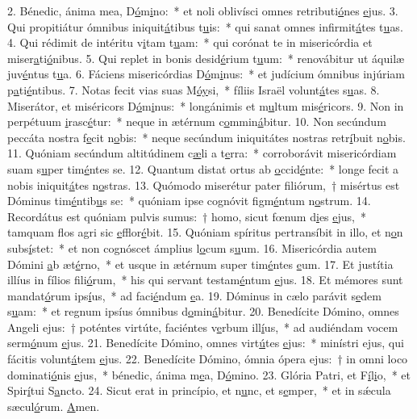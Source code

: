 2. Bénedic, ánima mea, D\uline{ó}m\uline{i}no:~* et noli oblivísci omnes retributi\uline{ó}nes \uline{e}jus.
3. Qui propitiátur ómnibus iniquit\uline{á}tibus t\uline{u}is:~* qui sanat omnes infirmit\uline{á}tes t\uline{u}as.
4. Qui rédimit de intéritu v\uline{i}tam t\uline{u}am:~* qui corónat te in misericórdia et miser\uline{a}ti\uline{ó}nibus.
5. Qui replet in bonis desid\uline{é}rium t\uline{u}um:~* renovábitur ut áquilæ juv\uline{é}ntus t\uline{u}a.
6. Fáciens misericórdias D\uline{ó}m\uline{i}nus:~* et judícium ómnibus injúriam p\uline{a}ti\uline{é}ntibus.
7. Notas fecit vias suas M\uline{ó}\uline{y}si,~* fíliis Israël volunt\uline{á}tes s\uline{u}as.
8. Miserátor, et miséricors D\uline{ó}m\uline{i}nus:~* longánimis et m\uline{u}ltum mis\uline{é}ricors.
9. Non in perpétuum \uline{i}rasc\uline{é}tur:~* neque in ætérnum c\uline{o}mmin\uline{á}bitur.
10. Non secúndum peccáta nostra f\uline{e}cit n\uline{o}bis:~* neque secúndum iniquitátes nostras retr\uline{í}buit n\uline{o}bis.
11. Quóniam secúndum altitúdinem c\uline{æ}li a t\uline{e}rra:~* corroborávit misericórdiam suam s\uline{u}per tim\uline{é}ntes se.
12. Quantum distat ortus ab \uline{o}ccid\uline{é}nte:~* longe fecit a nobis iniquit\uline{á}tes n\uline{o}stras.
13. Quómodo miserétur pater filiórum,~† misértus est Dóminus tim\uline{é}ntib\uline{u}s se:~* quóniam ipse cognóvit figm\uline{é}ntum n\uline{o}strum.
14. Recordátus est quóniam pulvis sumus:~† homo, sicut fœnum d\uline{i}es \uline{e}jus,~* tamquam flos agri sic \uline{e}fflor\uline{é}bit.
15. Quóniam spíritus pertransíbit in illo, et n\uline{o}n subs\uline{í}stet:~* et non cognóscet ámplius l\uline{o}cum s\uline{u}um.
16. Misericórdia autem Dómini \uline{a}b æt\uline{é}rno,~* et usque in ætérnum super tim\uline{é}ntes \uline{e}um.
17. Et justítia illíus in fílios f\uline{i}li\uline{ó}rum,~* his qui servant testam\uline{é}ntum \uline{e}jus.
18. Et mémores sunt mandat\uline{ó}rum ips\uline{í}us,~* ad faci\uline{é}ndum \uline{e}a.
19. Dóminus in cælo parávit s\uline{e}dem s\uline{u}am:~* et regnum ipsíus ómnibus d\uline{o}min\uline{á}bitur.
20. Benedícite Dómino, omnes Angeli ejus:~† poténtes virtúte, faciéntes v\uline{e}rbum ill\uline{í}us,~* ad audiéndam vocem serm\uline{ó}num \uline{e}jus.
21. Benedícite Dómino, omnes virt\uline{ú}tes \uline{e}jus:~* minístri ejus, qui fácitis volunt\uline{á}tem \uline{e}jus.
22. Benedícite Dómino, ómnia ópera ejus:~† in omni loco dominati\uline{ó}nis \uline{e}jus,~* bénedic, ánima m\uline{e}a, D\uline{ó}mino.
23. Glória Patri, et F\uline{í}l\uline{i}o,~* et Spir\uline{í}tui S\uline{a}ncto.
24. Sicut erat in princípio, et n\uline{u}nc, et s\uline{e}mper,~* et in sǽcula sæcul\uline{ó}rum. \uline{A}men.
